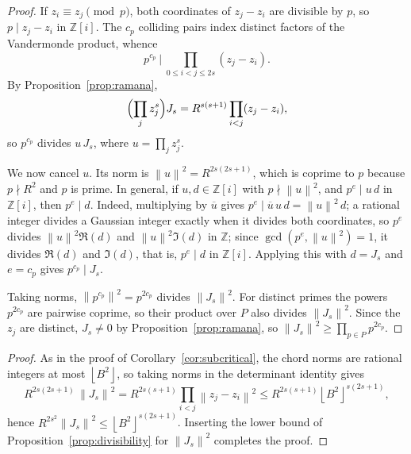 \documentclass[11pt]{article}
\newcommand{\Z}{\mathbb Z}
\newcommand{\GI}{\mathbb Z[i]}
\newcommand{\Norm}[1]{\left\lVert#1\right\rVert^2}
\newcommand{\floor}[1]{\left\lfloor #1 \right\rfloor}
\newcommand{\conj}[1]{\overline{#1}}
\begin{document}
\determinantdivisibility*

\begin{proof}
If \(z_i\equiv z_j\pmod p\), both coordinates of \(z_j-z_i\) are divisible by \(p\), so \(p\mid z_j-z_i\) in \(\GI\).
The \(c_p\) colliding pairs index distinct factors of the Vandermonde product, whence
\[
  p^{c_p}\ \Big|\ \prod_{0\le i<j\le 2s}(z_j-z_i).
\]
By Proposition~\ref{prop:ramana},
\[
  \Bigl(\prod_j z_j^s\Bigr) J_s
  =
  R^{s(s+1)}\prod_{i<j}(z_j-z_i),
\]
so \(p^{c_p}\) divides \(u\,J_s\), where \(u=\prod_j z_j^s\).

We now cancel \(u\).
Its norm is \(\Norm{u}=R^{2s(2s+1)}\), which is coprime to \(p\) because \(p\nmid R^2\) and \(p\) is prime.
In general, if \(u,d\in\GI\) with \(p\nmid\Norm{u}\), and \(p^e\mid u\,d\) in \(\GI\), then \(p^e\mid d\).
Indeed, multiplying by \(\conj u\) gives \(p^e\mid \conj u\,u\,d=\Norm{u}\,d\); a rational integer divides a Gaussian integer exactly when it divides both coordinates, so \(p^e\) divides \(\Norm{u}\Re(d)\) and \(\Norm{u}\Im(d)\) in \(\Z\); since \(\gcd(p^e,\Norm{u})=1\), it divides \(\Re(d)\) and \(\Im(d)\), that is, \(p^e\mid d\) in \(\GI\).
Applying this with \(d=J_s\) and \(e=c_p\) gives \(p^{c_p}\mid J_s\).

Taking norms, \(\Norm{p^{c_p}}=p^{2c_p}\) divides \(\Norm{J_s}\).
For distinct primes the powers \(p^{2c_p}\) are pairwise coprime, so their product over \(P\) also divides \(\Norm{J_s}\).
Since the \(z_j\) are distinct, \(J_s\ne0\) by Proposition~\ref{prop:ramana}, so \(\Norm{J_s}\ge\prod_{p\in P}p^{2c_p}\).
\end{proof}

\enhancedobstruction*

\begin{proof}
As in the proof of Corollary~\ref{cor:subcritical}, the chord norms are rational integers at most \(\floor{B^2}\), so taking norms in the determinant identity gives
\[
  R^{2s(2s+1)}\,\Norm{J_s}
  =
  R^{2s(s+1)}\prod_{i<j}\Norm{z_j-z_i}
  \le
  R^{2s(s+1)}\floor{B^2}^{s(2s+1)},
\]
hence \(R^{2s^2}\Norm{J_s}\le \floor{B^2}^{s(2s+1)}\).
Inserting the lower bound of Proposition~\ref{prop:divisibility} for \(\Norm{J_s}\) completes the proof.
\end{proof}

\missingprimebranch*
\end{document}
